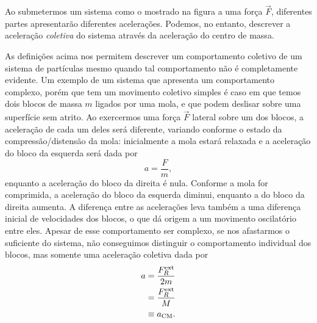 \begin{marginfigure}
\centering
{}
\caption{Ao submetermos um sistema como o mostrado na figura a uma força $\vec{F}$, diferentes partes apresentarão diferentes acelerações. Podemos, no entanto, descrever a aceleração \emph{coletiva} do sistema através da aceleração do centro de massa.}
\end{marginfigure}

As definições acima nos permitem descrever um comportamento coletivo de um sistema de partículas mesmo quando tal comportamento não é completamente evidente. Um exemplo de um sistema que apresenta um comportamento complexo, porém que tem um movimento coletivo simples é caso em que temos dois blocos de massa $m$ ligados por uma mola, e que podem deslisar sobre uma superfície sem atrito. Ao exercermos uma força $\vec{F}$ lateral sobre um dos blocos, a aceleração de cada um deles será diferente, variando conforme o estado da compressão/distensão da mola: inicialmente a mola estará relaxada e a aceleração do bloco da esquerda será dada por
\begin{equation}
    a = \frac{F}{m},
\end{equation}
%
enquanto a aceleração do bloco da direita é nula. Conforme a mola for comprimida, a aceleração do bloco da esquerda diminui, enquanto a do bloco da direita aumenta. A diferença entre as acelerações leva também a uma diferença inicial de velocidades dos blocos, o que dá origem a um movimento oscilatório entre eles. Apesar de esse comportamento ser complexo, se nos afastarmos o suficiente do sistema, não conseguimos distinguir o comportamento individual dos blocos, mas somente uma aceleração coletiva dada por
\begin{align}
    a &= \frac{F_R^{\rm{ext}}}{2m} \\
    &= \frac{F_R^{\rm{ext}}}{M} \\
    &\equiv a_{\rm{CM}}.
\end{align}


